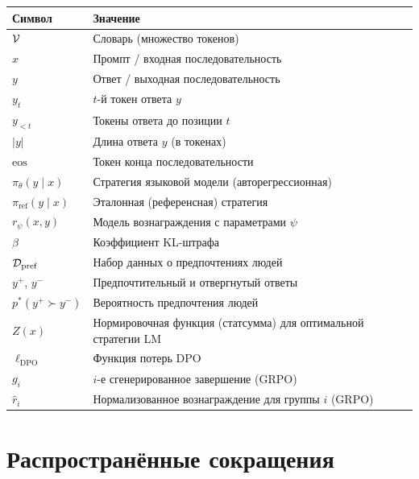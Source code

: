 \begin{center}
\begin{tabular}{@{}ll@{}}
\toprule
\textbf{Символ} & \textbf{Значение} \\
\midrule
$\mathcal{V}$                    & Словарь (множество токенов) \\
$x$                      & Промпт / входная последовательность \\
$y$                      & Ответ / выходная последовательность \\
$y_t$                    & $t$-й токен ответа $y$ \\
$y_{<t}$                 & Токены ответа до позиции $t$ \\
$|y|$                    & Длина ответа $y$ (в токенах) \\
$\mathrm{eos}$           & Токен конца последовательности \\
$\pi_\theta(y\mid x)$    & Стратегия языковой модели (авторегрессионная) \\
$\pi_\mathrm{ref}(y\mid x)$ & Эталонная (референсная) стратегия \\
$r_\psi(x,y)$            & Модель вознаграждения с параметрами $\psi$ \\
$\beta$                  & Коэффициент KL-штрафа \\
$\mathcal{D}_\mathrm{pref}$      & Набор данных о предпочтениях людей \\
$y^+$, $y^-$             & Предпочтительный и отвергнутый ответы \\
$p^*(y^+\succ y^-)$      & Вероятность предпочтения людей \\
$Z(x)$                   & Нормировочная функция (статсумма) для оптимальной стратегии LM \\
$\ell_\mathrm{DPO}$      & Функция потерь DPO \\
$g_i$                    & $i$-е сгенерированное завершение (GRPO) \\
$\hat{r}_i$              & Нормализованное вознаграждение для группы $i$ (GRPO) \\
\bottomrule
\end{tabular}
\end{center}

\section*{Распространённые сокращения}

